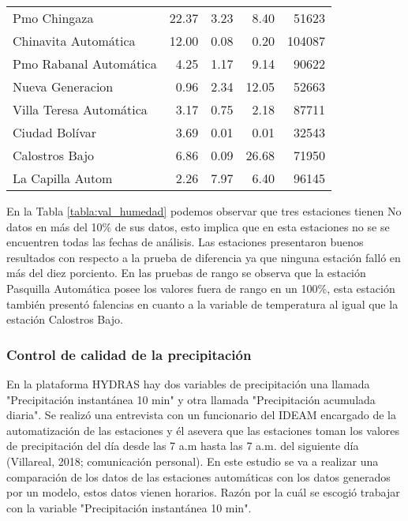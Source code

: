 \begin{table}[H]
\begin{center}
\begin{tabular}{p{5cm}rrrr}
            Pmo Chingaza &     22.37 &           3.23 &      8.40 &         51623 \\
    Chinavita Automática &     12.00 &           0.08 &      0.20 &        104087 \\
  Pmo Rabanal Automática &      4.25 &           1.17 &      9.14 &         90622 \\
        Nueva Generacion &      0.96 &           2.34 &     12.05 &         52663 \\
 Villa Teresa Automática &      3.17 &           0.75 &      2.18 &         87711 \\
          Ciudad Bolívar &      3.69 &           0.01 &      0.01 &         32543 \\
          Calostros Bajo &      6.86 &           0.09 &     26.68 &         71950 \\
        La Capilla Autom &      2.26 &           7.97 &      6.40 &         96145 \\
\bottomrule
\end{tabular}
\end{center}
\end{table}

En la Tabla \ref{tabla:val_humedad} podemos observar que tres estaciones tienen No datos en más del 10\% de sus datos, esto implica que en esta estaciones no se se encuentren todas las fechas de análisis. Las estaciones presentaron buenos resultados con respecto a la prueba de diferencia ya que ninguna estación falló en más del diez porciento. En las pruebas de rango se observa que la estación Pasquilla Automática posee los valores fuera de rango en un 100\%, esta estación también presentó falencias en cuanto a la variable de temperatura al igual que la estación Calostros Bajo.

\subsubsection{Control de calidad de la precipitación}

En la plataforma HYDRAS hay dos variables de precipitación una llamada "Precipitación instantánea 10 min" y otra llamada "Precipitación acumulada diaria". Se realizó una entrevista con un funcionario del IDEAM encargado de la automatización de las estaciones y él asevera que las estaciones toman los valores de precipitación del día desde las 7 a.m hasta las 7 a.m. del siguiente día (Villareal, 2018; comunicación personal). En este estudio se va a realizar una comparación de los datos de las estaciones automáticas con los datos generados por un modelo, estos datos vienen horarios. Razón por la cuál se escogió trabajar con la variable "Precipitación instantánea 10 min".\\


